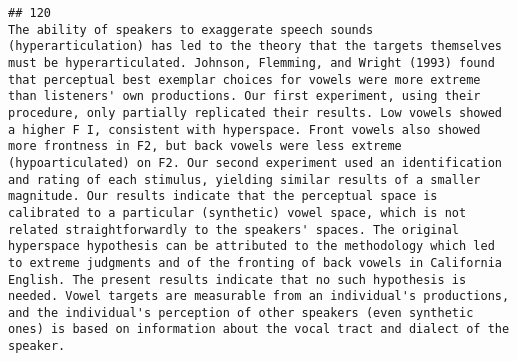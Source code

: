 \documentclass[
  english,
  man]{apa6}
\begin{document}
\begin{verbatim}
## 120                                                                                                                                                                                                                                                                                                                                                                                                                                                                                                                                                                                                                                                                                                                                                                                                                                                                                                                                                                                                                                                                                                                                                                                                                                                                                                                                                        The ability of speakers to exaggerate speech sounds (hyperarticulation) has led to the theory that the targets themselves must be hyperarticulated. Johnson, Flemming, and Wright (1993) found that perceptual best exemplar choices for vowels were more extreme than listeners' own productions. Our first experiment, using their procedure, only partially replicated their results. Low vowels showed a higher F I, consistent with hyperspace. Front vowels also showed more frontness in F2, but back vowels were less extreme (hypoarticulated) on F2. Our second experiment used an identification and rating of each stimulus, yielding similar results of a smaller magnitude. Our results indicate that the perceptual space is calibrated to a particular (synthetic) vowel space, which is not related straightforwardly to the speakers' spaces. The original hyperspace hypothesis can be attributed to the methodology which led to extreme judgments and of the fronting of back vowels in California English. The present results indicate that no such hypothesis is needed. Vowel targets are measurable from an individual's productions, and the individual's perception of other speakers (even synthetic ones) is based on information about the vocal tract and dialect of the speaker.

\end{verbatim}
\end{document}
